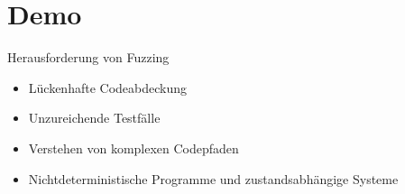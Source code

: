 \section{Demo}\label{sec:demo2}
\begin{frame}{Herausforderung von Fuzzing}
    \begin{itemize}
        \item Lückenhafte Codeabdeckung
        \item Unzureichende Testfälle
        \item Verstehen von komplexen Codepfaden
        \item Nichtdeterministische Programme und zustandsabhängige Systeme
    \end{itemize}
\end{frame}